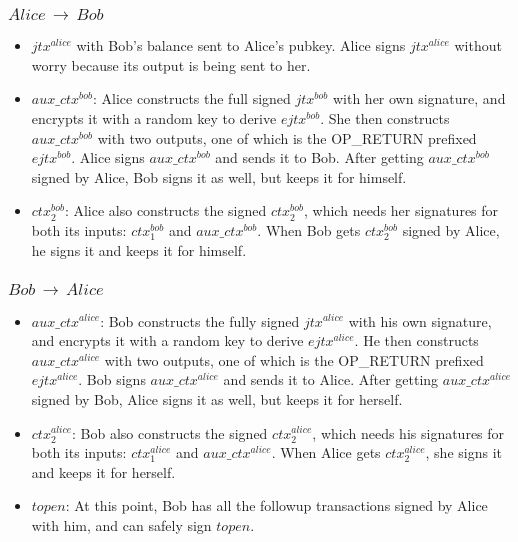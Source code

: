 \subsubsection{$Alice\,\to\,Bob$}
\begin{itemize}[leftmargin=4\parindent]
    \item $\mathit{jtx^{alice}}$ with Bob's balance sent to Alice's pubkey. Alice signs $\mathit{jtx^{alice}}$ without worry because its output is being sent to her.
    \item $\mathit{aux\_ctx^{bob}}$: Alice constructs the full signed $\mathit{jtx^{bob}}$ with her own signature, and encrypts it with a random key to derive $\mathit{ejtx^{bob}}$. She then constructs $\mathit{aux\_ctx^{bob}}$ with two outputs, one of which is the OP\_RETURN prefixed $\mathit{ejtx^{bob}}$. Alice signs $\mathit{aux\_ctx^{bob}}$ and sends it to Bob. After getting $\mathit{aux\_ctx^{bob}}$ signed by Alice, Bob signs it as well, but keeps it for himself.
    \item $\mathit{ctx_2^{bob}}$: Alice also constructs the signed $\mathit{ctx_2^{bob}}$, which needs her signatures for both its inputs: $\mathit{ctx_1^{bob}}$ and $\mathit{aux\_ctx^{bob}}$. When Bob gets $\mathit{ctx_2^{bob}}$ signed by Alice, he signs it and keeps it for himself.
\end{itemize}
\subsubsection{$Bob\,\to\,Alice$}
\begin{itemize}[leftmargin=4\parindent]
    \item $\mathit{aux\_ctx^{alice}}$: Bob constructs the fully signed $\mathit{jtx^{alice}}$ with his own signature, and encrypts it with a random key to derive $\mathit{ejtx^{alice}}$. He then constructs $\mathit{aux\_ctx^{alice}}$ with two outputs, one of which is the OP\_RETURN prefixed $\mathit{ejtx^{alice}}$. Bob signs $\mathit{aux\_ctx^{alice}}$ and sends it to Alice. After getting $\mathit{aux\_ctx^{alice}}$ signed by Bob, Alice signs it as well, but keeps it for herself.
    \item $\mathit{ctx_2^{alice}}$: Bob also constructs the signed $\mathit{ctx_2^{alice}}$, which needs his signatures for both its inputs: $\mathit{ctx_1^{alice}}$ and $\mathit{aux\_ctx^{alice}}$. When Alice gets $\mathit{ctx_2^{alice}}$, she signs it and keeps it for herself.     
    \item $\mathit{topen}$: At this point, Bob has all the followup transactions signed by Alice with him, and can safely sign $\mathit{topen}$.
\end{itemize}
